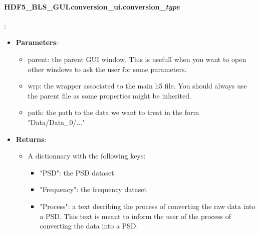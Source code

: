 \begin{tcolorbox}
    \paragraph{HDF5\_BLS\_GUI.conversion\_ui.conversion\_\textit{type}}:
    \begin{itemize}
        \item \textbf{Parameters}:
        \begin{itemize}
            \item parent: the parent GUI window. This is usefull when you want to open other windows to ask the user for some parameters.
            \item wrp: the wrapper associated to the main h5 file. You should always use the parent file as some properties might be inherited.
            \item path: the path to the data we want to treat in the form "Data/Data\_0/..."
        \end{itemize} 
        \item \textbf{Returns}:
        \begin{itemize}
            \item A dictionnary with the following keys:
            \begin{itemize}
                \item "PSD": the PSD dataset
                \item "Frequency": the frequency dataset
                \item "Process": a text decribing the process of converting the raw data into a PSD. This text is meant to inform the user of the process of converting the data into a PSD.
            \end{itemize}
        \end{itemize} 
    \end{itemize}
\end{tcolorbox}

